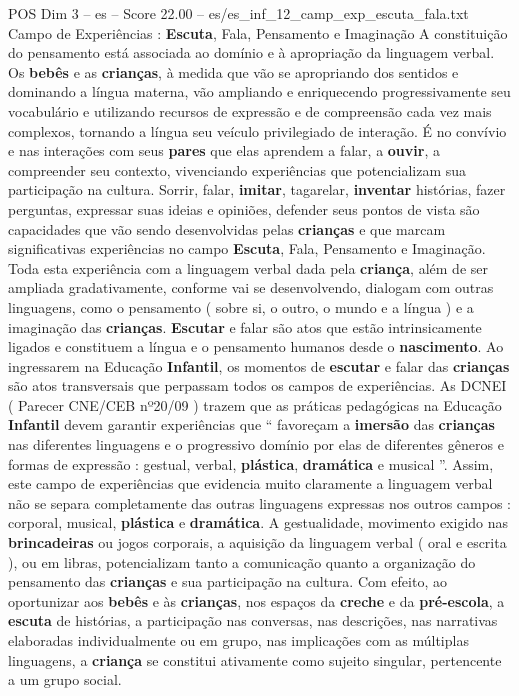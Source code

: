 \begin{textsample}{POS Dim 3 – es – Score 22.00 – es/es\_inf\_12\_camp\_exp\_escuta\_fala.txt}  \label{ex:f3_pos_113}
Campo de Experiências : \textbf{Escuta}, Fala, Pensamento e Imaginação A constituição do pensamento está associada ao domínio e à apropriação da linguagem verbal.
Os \textbf{bebês} e as \textbf{crianças}, à medida que vão se apropriando dos sentidos e dominando a língua materna, vão ampliando e enriquecendo progressivamente seu vocabulário e utilizando recursos de expressão e de compreensão cada vez mais complexos, tornando a língua seu veículo privilegiado de interação.
É no convívio e nas interações com seus \textbf{pares} que elas aprendem a falar, a \textbf{ouvir}, a compreender seu contexto, vivenciando experiências que potencializam sua participação na cultura.
Sorrir, falar, \textbf{imitar}, tagarelar, \textbf{inventar} histórias, fazer perguntas, expressar suas ideias e opiniões, defender seus pontos de vista são capacidades que vão sendo desenvolvidas pelas \textbf{crianças} e que marcam significativas experiências no campo \textbf{Escuta}, Fala, Pensamento e Imaginação.
Toda esta experiência com a linguagem verbal dada pela \textbf{criança}, além de ser ampliada gradativamente, conforme vai se desenvolvendo, dialogam com outras linguagens, como o pensamento ( sobre si, o outro, o mundo e a língua ) e a imaginação das \textbf{crianças}. \textbf{Escutar} e falar são atos que estão intrinsicamente ligados e constituem a língua e o pensamento humanos desde o \textbf{nascimento}.
Ao ingressarem na Educação \textbf{Infantil}, os momentos de \textbf{escutar} e falar das \textbf{crianças} são atos transversais que perpassam todos os campos de experiências.
As DCNEI ( Parecer CNE/CEB nº20/09 ) trazem que as práticas pedagógicas na Educação \textbf{Infantil} devem garantir experiências que “ favoreçam a \textbf{imersão} das \textbf{crianças} nas diferentes linguagens e o progressivo domínio por elas de diferentes gêneros e formas de expressão : gestual, verbal, \textbf{plástica}, \textbf{dramática} e musical ”.
Assim, este campo de experiências que evidencia muito claramente a linguagem verbal não se separa completamente das outras linguagens expressas nos outros campos : corporal, musical, \textbf{plástica} e \textbf{dramática}.
A gestualidade, movimento exigido nas \textbf{brincadeiras} ou jogos corporais, a aquisição da linguagem verbal ( oral e escrita ), ou em libras, potencializam tanto a comunicação quanto a organização do pensamento das \textbf{crianças} e sua participação na cultura.
Com efeito, ao oportunizar aos \textbf{bebês} e às \textbf{crianças}, nos espaços da \textbf{creche} e da \textbf{pré-escola}, a \textbf{escuta} de histórias, a participação nas conversas, nas descrições, nas narrativas elaboradas individualmente ou em grupo, nas implicações com as múltiplas linguagens, a \textbf{criança} se constitui ativamente como sujeito singular, pertencente a um grupo social.

\end{textsample}
